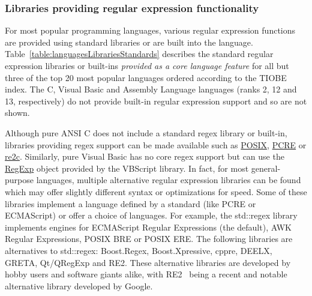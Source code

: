 \subsubsection{Libraries providing regular expression functionality}
For most popular programming languages, various regular expression functions are provided using standard libraries or are built into the language.  Table~\ref{table:languagesLibrariesStandards} describes the standard regular expression libraries or built-ins \emph{provided as a core language feature} for all but three of the top 20 most popular languages ordered according to the TIOBE index. The C, Visual Basic and Assembly Language languages (ranks 2, 12 and 13, respectively) do not provide built-in regular expression support and so are not shown.



Although pure ANSI C does not include a standard regex library or built-in, libraries providing regex support can be made available such as \underline{POSIX}, \underline{PCRE} or \underline{re2c}.  Similarly, pure Visual Basic has no core regex support but can use the \underline{RegExp} object provided by the VBScript library.  In fact, for most general-purpose languages, multiple alternative regular expression libraries can be found which may offer slightly different syntax or optimizations for speed.  Some of these libraries implement a language defined by a standard (like PCRE or ECMAScript) or offer a choice of languages.  For example, the std::regex library implements engines for ECMAScript Regular Expressions (the default), AWK Regular Expressions,  POSIX BRE or POSIX ERE.  The following libraries are alternatives to std::regex: Boost.Regex, Boost.Xpressive, cppre, DEELX, GRETA, Qt/QRegExp and RE2.  These alternative libraries are developed by hobby users and software giants alike, with RE2~\cite{re2} being a recent and notable alternative library developed by Google.

